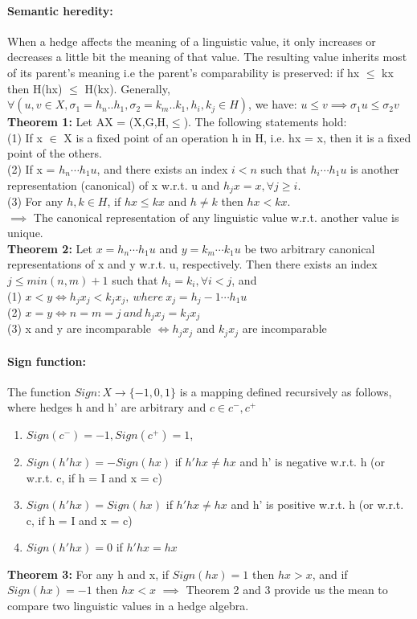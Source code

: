 \documentclass[part1.tex]{subfiles}
\begin{document}
\paragraph {Semantic heredity:} When a hedge affects the meaning of a linguistic value, it only
	increases or decreases a little bit the meaning of that value. The resulting value inherits
	most of its parent's meaning i.e the parent's comparability is preserved: 
	if hx \(\le\) kx then H(hx) \(\le\) H(kx). Generally, \(\forall (u,v \in X, 
	\sigma_1 = h_n..h_1, \sigma_2 = k_m..k_1, h_i,k_j \in H)\), we have:
	\(u \le v \implies \sigma_1u \le \sigma_2v\)\\
{\bfseries Theorem 1:} Let AX = (X,G,H,\(\le\)). The following statements hold:\\
\indent (1) If x \(\in\) X is a fixed point of an operation h in H, i.e. hx = x, then it is a fixed
	 point of the others.\\
\indent (2) If x = \(h_n \cdots h_1 u\), and there exists an index \(i<n\) such that \(h_i \cdots h_1 u\)        is another representation (canonical) of x w.r.t. u and \(h_j x = x, \forall j\ge i\).\\
\indent (3) For any \(h, k\in H\), if \(hx\le kx\) and \(h\neq k\) then \(hx< kx\).\\
\indent \(\implies\) The canonical representation of any linguistic value w.r.t. another value is unique.	\\
{\bfseries Theorem 2:} Let \(x = h_n \cdots h_1 u\) and \(y = k_m \cdots k_1 u\) be two arbitrary
	canonical representations of x and y w.r.t. u, respectively. Then there exists an index
        \(j \le min(n, m) + 1\) such that \(h_i = k_i, \forall i < j\), and\\
\indent (1) \(x < y \iff h_j x_j < k_j x_j ,\: where \: x_j = h_j-1 \cdots h_1 u\)\\
\indent (2) \(x = y \iff n = m = j\: and\: h_j x_j = k_j x_j\)\\
\indent (3) x and y are incomparable \(\iff h_j x_j\) and \(k_j x_j\) are incomparable\\
\paragraph {Sign function:} The function $Sign: X \rightarrow
\{-1,0,1\}$ is a mapping defined recursively as follows, where
hedges h and h' are arbitrary and $c \in c^{-}, c^{+}$
\begin{enumerate}
        \item $Sign(c^{-}) = -1, Sign(c^{+}) = 1$,
        \item $Sign(h'hx) = -Sign(hx)$ if $h'hx \neq hx$ and h'
                is negative w.r.t. h (or w.r.t. c, if h = I and x
                = c)
        \item $Sign(h'hx) = Sign(hx)$ if $h'hx \neq hx$ and h'
                is positive w.r.t. h (or w.r.t. c, if h = I and x
                = c)
        \item $Sign(h'hx) = 0$ if $h'hx = hx$
\end{enumerate}
{\bfseries Theorem 3:} For any h and x, if $Sign(hx) = 1$ then
$hx > x$, and if $Sign(hx) = -1$ then $hx < x$
\indent \(\implies\) Theorem 2 and 3 provide us the mean to
compare two linguistic values in a hedge 
algebra.
\end{document}
